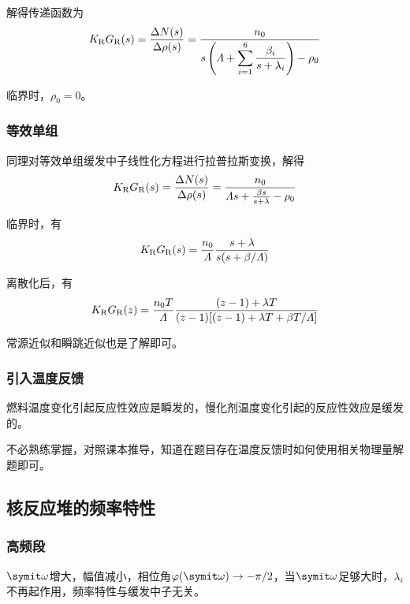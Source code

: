 解得传递函数为
\begin{equation}
    K_{\rm R} G_{\rm R}(s) = \frac{\Delta N(s)}{\Delta \rho(s)} = \frac{n_0}{\displaystyle s\left(\varLambda + \sum_{i=1}^{6} \frac{\beta_i}{s+\lambda_i}\right) - \rho_0}
\end{equation}

临界时，$\rho_0 = 0$。

\subsubsection{等效单组}
同理对等效单组缓发中子线性化方程进行拉普拉斯变换，解得
\begin{equation}
    K_{\rm R} G_{\rm R}(s) = \frac{\Delta N(s)}{\Delta \rho(s)} = \frac{n_0}{\varLambda s + \frac{\beta s}{s+\lambda} - \rho_0}
\end{equation}

临界时，有
\begin{equation}
    K_{\rm R} G_{\rm R}(s) = \frac{n_0}{\varLambda} \frac{s+\lambda}{s(s+\beta/\varLambda)}
\end{equation}

离散化后，有
\begin{equation}
    K_{\rm R} G_{\rm R}(z) = \frac{n_0 T}{\varLambda} \frac{(z-1)+\lambda T}{(z-1)[(z-1)+\lambda T+\beta T/\varLambda]}
\end{equation}

常源近似和瞬跳近似也是了解即可。

\subsubsection{引入温度反馈}

燃料温度变化引起反应性效应是瞬发的，慢化剂温度变化引起的反应性效应是缓发的。

不必熟练掌握，对照课本推导，知道在题目存在温度反馈时如何使用相关物理量解题即可。

\subsection{核反应堆的频率特性}

\subsubsection{高频段}
$\varomega$增大，幅值减小，相位角$\varphi(\varomega) \to -\pi/2$，当$\varomega$足够大时，$\lambda_i$不再起作用，频率特性与缓发中子无关。

